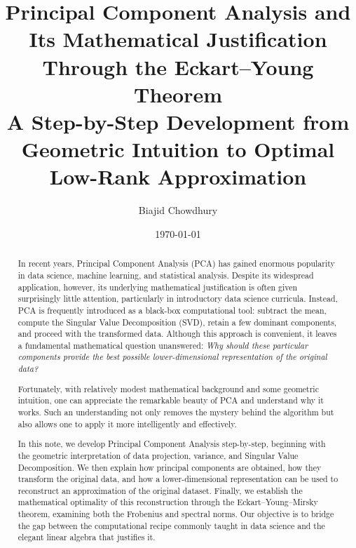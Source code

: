 \documentclass[11pt]{article}
\title{
\textbf{
Principal Component Analysis and Its
Mathematical Justification Through the
Eckart--Young Theorem
}\\[0.3cm]
\large
A Step-by-Step Development from Geometric
Intuition to Optimal Low-Rank Approximation
}
\author{Biajid Chowdhury}
\date{\today}
\begin{document}
\maketitle













\begin{abstract}

In recent years, Principal Component Analysis (PCA) has gained
enormous popularity in data science, machine learning, and
statistical analysis. Despite its widespread application,
however, its underlying mathematical justification is often
given surprisingly little attention, particularly in
introductory data science curricula. Instead, PCA is
frequently introduced as a black-box computational tool:
subtract the mean, compute the Singular Value Decomposition
(SVD), retain a few dominant components, and proceed with
the transformed data. Although this approach is convenient,
it leaves a fundamental mathematical question unanswered:
\textit{Why should these particular components provide the
best possible lower-dimensional representation of the
original data?}

Fortunately, with relatively modest mathematical
background and some geometric intuition, one can
appreciate the remarkable beauty of PCA and understand
why it works. Such an understanding not only removes
the mystery behind the algorithm but also allows
one to apply it more intelligently and effectively.

In this note, we develop Principal Component Analysis
step-by-step, beginning with the geometric interpretation
of data projection, variance, and Singular Value
Decomposition. We then explain how principal components
are obtained, how they transform the original data,
and how a lower-dimensional representation can be
used to reconstruct an approximation of the original
dataset. Finally, we establish the mathematical
optimality of this reconstruction through the
Eckart--Young--Mirsky theorem, examining both the
Frobenius and spectral norms. Our objective is to
bridge the gap between the computational recipe
commonly taught in data science and the elegant
linear algebra that justifies it.

\end{abstract}
\end{document}
